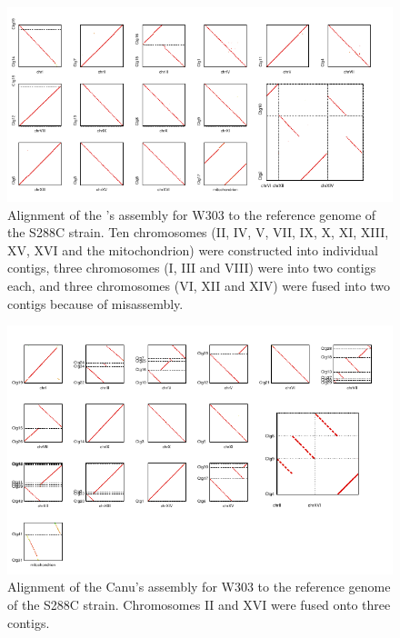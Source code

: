 \begin{figure}[!hpt]
\centering
\includegraphics[width=19cm]{images/suppFigure3.pdf}
\caption[Alignment of the  \npscarf{}'s assembly for \sce{} W303 to the reference
genome of the S288C strain]{Alignment of the  \npscarf{}'s assembly for \sce{} W303 to the reference genome of the S288C strain. Ten chromosomes (II, IV, V, VII, IX, X, XI, XIII, XV, XVI and the mitochondrion) were constructed into individual contigs, three chromosomes (I, III and VIII) were into two contigs each, and three chromosomes (VI, XII and XIV) were fused into two contigs because of misassembly.}
\label{SF:alignW303rt}
\end{figure}


\begin{figure}[!hpt]
\centering
\includegraphics[width=19cm]{images/suppFigure4.pdf}
\caption[Alignment of the Canu's assembly for \sce{} W303 to the reference
genome of the S288C strain]{Alignment of the Canu's assembly for \sce{} W303 to the reference genome of the S288C strain.  Chromosomes II and XVI were fused onto three
contigs.
}
\label{SF:alignW303Canu}
\end{figure}


